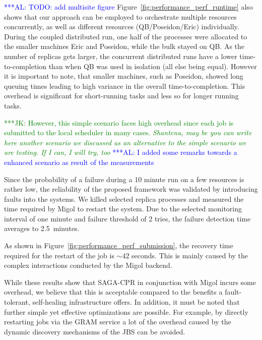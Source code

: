 \documentclass{rspublic}
\newcommand{\kimnote}[1]{ {\textcolor{green} { ***JK: #1 }}}
\newcommand{\alnote}[1]{ {\textcolor{blue} { ***AL: #1 }}}
\newcommand{\kimnote}[1]{}
\newcommand{\alnote}[1]{}
\begin{document}
\alnote{TODO: add multisite figure}
Figure~\ref{fig:performance_perf_runtime} also shows that our approach
can be employed to orchestrate multiple resources concurrently, as
well as different resources (QB/Poseidon/Eric) individually.  During
the coupled distributed run, one half of the processes were allocated to
the smaller machines Eric and Poseidon, while the bulk stayed on QB.  As the
number of replicas gets larger, the concurrent distributed runs have a
lower time-to-completion than when QB was used in isolation 
(all else being equal). However it is important to note, that
smaller machines, such as Poseidon, showed long queuing times leading
to high variance in the overall time-to-completion. This overhead is
significant for short-running tasks and less so for longer running
tasks. 

\kimnote{However, this simple scenario faces high overhead since each
  job is submitted to the local scheduler in many cases. \it Shantenu,
  may be you can write here another scenario we discussed as an
  alternative to the simple scenario we are testing.  If I can, I will
  try, too } \alnote{I added some remarks towards a enhanced scenario
  as result of the measurements}
  

Since the probability of a failure during a 10 minute run on a few
resources is rather low, the reliability of the proposed framework was
validated by introducing faults into the systems. We killed selected
replica processes and measured the time required by Migol to restart
the system.  Due to the selected monitoring interval of one minute and
failure threshold of 2 tries, the failure detection time averages to
2.5\, minutes.

As shown in Figure~\ref{fig:performance_perf_submission}, the recovery
time required for the restart of the job is $\sim42$ seconds. This is
mainly caused by the complex interactions conducted by the Migol
backend.


While these results show that SAGA-CPR in conjunction with Migol
incurs some overhead, we believe that this is acceptable compared to
the benefits a fault-tolerant, self-healing infrastructure offers. In
addition, it must be noted that further simple yet effective
optimizations are possible. For example, by directly restarting jobs
via the GRAM service a lot of the overhead caused by the dynamic
discovery mechanisms of the JBS can be avoided. 
\end{document}

